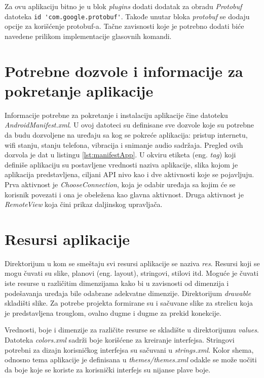 \documentclass[implementacija.tex]{subfiles}
\begin{document}
Za ovu aplikaciju bitno je u blok \textit{plugins} dodati dodatak za obradu \textit{Protobuf} datoteka \verb|id 'com.google.protobuf'|. Takođe unutar bloka \textit{protobuf} se dodaju opcije za korišćenje protobuf-a. Tačne zavisnosti koje je potrebno dodati biće navedene prilikom implementacije glasovnih komandi. 

\section{Potrebne dozvole i informacije za pokretanje aplikacije}

Informacije potrebne za pokretanje i instalaciju aplikacije čine datoteku \textit{AndroidManifest.xml}. U ovoj datoteci su definisane sve dozvole koje su potrebne da budu dozvoljene na uređaju sa kog se pokreće aplikacija: pristup internetu, wifi stanju, stanju telefona, vibracija i  snimanje audio sadržaja. Pregled ovih dozvola je dat u listingu \ref{lst:manifestApp}. U okviru etiketa (eng. \textit{tag}) koji definiše aplikaciju su postavljene vrednosti naziva aplikacije, slika kojom je aplikacija predstavljena, ciljani API nivo kao i dve aktivnosti koje se pojavljuju. Prva aktivnost je \textit{ChooseConnection}, koja je odabir uređaja sa kojim će se korisnik povezati i ona je obeležena kao glavna aktivnost. Druga aktivnost je \textit{RemoteView} koja čini prikaz daljinskog upravljača. 




\section{Resursi aplikacije}
Direktorijum u kom se smeštaju svi resursi aplikacije se naziva \textit{res}. Resursi koji se mogu čuvati su slike, planovi (eng. layout), stringovi, stilovi itd. Moguće je čuvati iste resurse u različitim dimenzijama kako bi u zavisnosti od dimenzija i podešavanja uređaja bile odabrane adekvatne dimenzije. Direktorijum \textit{drawable} skladišti slike. Za potrebe projekta formirane su i sačuvane slike za strelicu koja je predstavljena trouglom, ovalno dugme i dugme za prekid konekcije. 

Vrednosti, boje i dimenzije za različite resurse se skladište u direktorijumu \textit{values}. Datoteka \textit{colors.xml} sadrži boje korišćene za kreiranje interfejsa. Stringovi potrebni za dizajn korisničkog interfejsa su sačuvani u \textit{strings.xml}. Kolor shema, odnosno tema aplikacije je definisana u \textit{themes/themes.xml} odakle se može uočiti da boje koje se koriste za korisnički interfejs su nijanse plave boje. 
\end{document}
